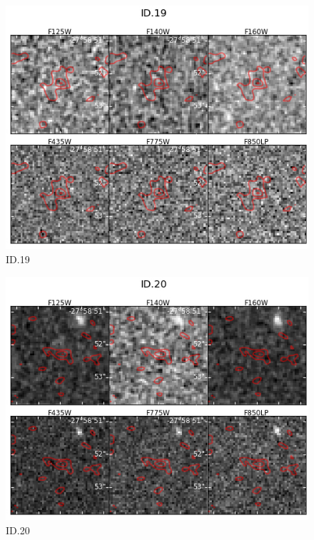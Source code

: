 \begin{figure}[tbp]
\centering \includegraphics[width=160mm]{Matched/ASPECS_Cutout_18.jpg}
\caption{ID.19}
\label{fig:Match_Three}
\end{figure}

\begin{figure}[tbp]
\centering \includegraphics[width=160mm]{Matched/ASPECS_Cutout_19.jpg}
\caption{ID.20}
\label{fig:Match_Three}
\end{figure}


